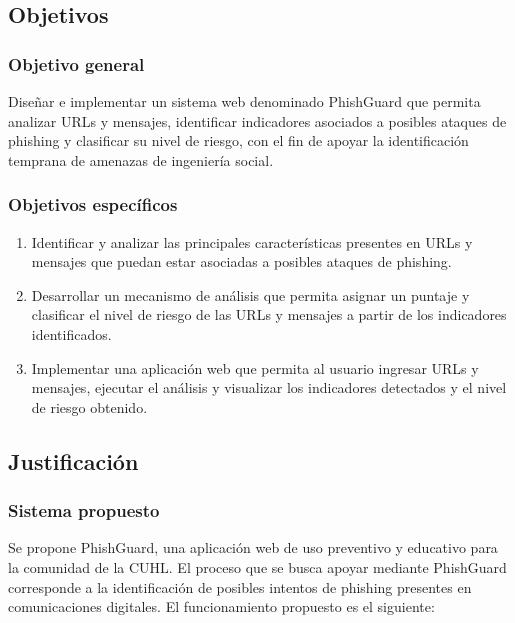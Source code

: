 \documentclass[journal,onecolumn,12pt,draftclsnofoot]{IEEEtran}
\begin{document}
\subsection{Objetivos}

\subsubsection{Objetivo general}

Diseñar e implementar un sistema web denominado PhishGuard que permita analizar URLs y mensajes, identificar indicadores asociados a posibles ataques de phishing y clasificar su nivel de riesgo, con el fin de apoyar la identificación temprana de amenazas de ingeniería social.

\subsubsection{Objetivos específicos}

\begin{enumerate}
  \item Identificar y analizar las principales características presentes en URLs y mensajes que puedan estar asociadas a posibles ataques de phishing.
  \item Desarrollar un mecanismo de análisis que permita asignar un puntaje y clasificar el nivel de riesgo de las URLs y mensajes a partir de los indicadores identificados.
  \item Implementar una aplicación web que permita al usuario ingresar URLs y mensajes, ejecutar el análisis y visualizar los indicadores detectados y el nivel de riesgo obtenido.
\end{enumerate}

\subsection{Justificación}\label{sec:just}

\subsubsection{Sistema propuesto}

Se propone PhishGuard, una aplicación web de uso preventivo y educativo para la comunidad de la CUHL. El proceso que se busca apoyar mediante PhishGuard corresponde a la identificación de posibles intentos de phishing presentes en comunicaciones digitales. El funcionamiento propuesto es el siguiente:
\end{document}
